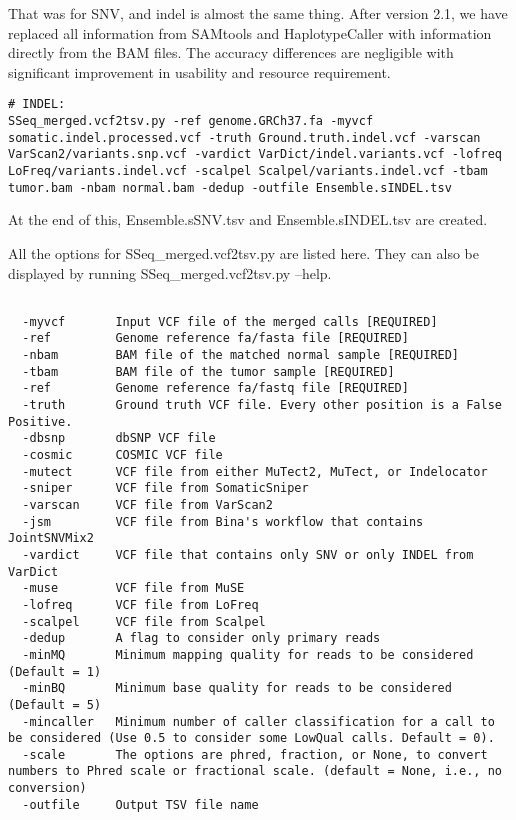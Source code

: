 \documentclass[10pt,letterpaper]{article}
\begin{document}
\begin{sloppypar}
That was for SNV, and indel is almost the same thing. After version 2.1, we have replaced all information from SAMtools and HaplotypeCaller with information directly from the BAM files. The accuracy differences are negligible with significant improvement in usability and resource requirement.

\begin{lstlisting}
# INDEL:
SSeq_merged.vcf2tsv.py -ref genome.GRCh37.fa -myvcf somatic.indel.processed.vcf -truth Ground.truth.indel.vcf -varscan VarScan2/variants.snp.vcf -vardict VarDict/indel.variants.vcf -lofreq LoFreq/variants.indel.vcf -scalpel Scalpel/variants.indel.vcf -tbam tumor.bam -nbam normal.bam -dedup -outfile Ensemble.sINDEL.tsv
\end{lstlisting}


At the end of this, Ensemble.sSNV.tsv and Ensemble.sINDEL.tsv are created. 

All the options for SSeq\_merged.vcf2tsv.py are listed here. They can also be displayed by running SSeq\_merged.vcf2tsv.py --help.

\begin{lstlisting}

  -myvcf       Input VCF file of the merged calls [REQUIRED]
  -ref         Genome reference fa/fasta file [REQUIRED]
  -nbam        BAM file of the matched normal sample [REQUIRED]
  -tbam        BAM file of the tumor sample [REQUIRED]
  -ref         Genome reference fa/fastq file [REQUIRED]
  -truth       Ground truth VCF file. Every other position is a False Positive.
  -dbsnp       dbSNP VCF file
  -cosmic      COSMIC VCF file
  -mutect      VCF file from either MuTect2, MuTect, or Indelocator
  -sniper      VCF file from SomaticSniper
  -varscan     VCF file from VarScan2
  -jsm         VCF file from Bina's workflow that contains JointSNVMix2
  -vardict     VCF file that contains only SNV or only INDEL from VarDict
  -muse        VCF file from MuSE
  -lofreq      VCF file from LoFreq
  -scalpel     VCF file from Scalpel
  -dedup       A flag to consider only primary reads
  -minMQ       Minimum mapping quality for reads to be considered (Default = 1)
  -minBQ       Minimum base quality for reads to be considered (Default = 5)
  -mincaller   Minimum number of caller classification for a call to be considered (Use 0.5 to consider some LowQual calls. Default = 0).
  -scale       The options are phred, fraction, or None, to convert numbers to Phred scale or fractional scale. (default = None, i.e., no conversion)
  -outfile     Output TSV file name
                        

\end{lstlisting}
\end{sloppypar}
\end{document}
